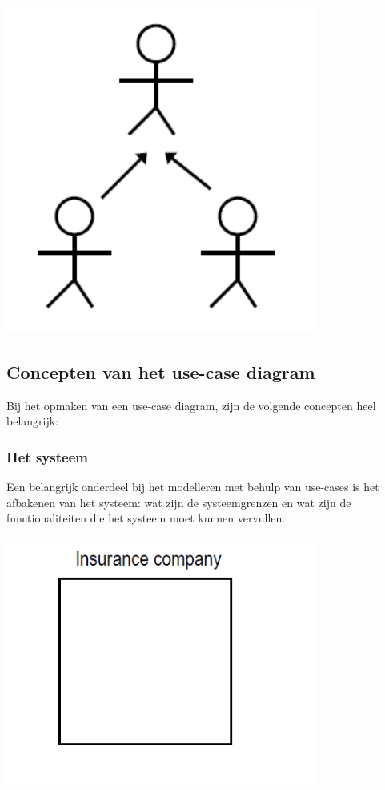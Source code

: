 
\begin{center}
\includegraphics[width=4in]{img/genact}%
\end{center}
\newpage
\subsection{Concepten van het use-case diagram}

Bij het opmaken van een use-case diagram, zijn de volgende concepten heel belangrijk:

\subsubsection{Het systeem}

Een belangrijk onderdeel bij het modelleren met behulp van use-cases is het afbakenen van het systeem: wat zijn de systeemgrenzen en wat zijn de functionaliteiten die het systeem moet kunnen vervullen.


\begin{center}
\includegraphics[width=4in]{img/scope}%
\end{center}

